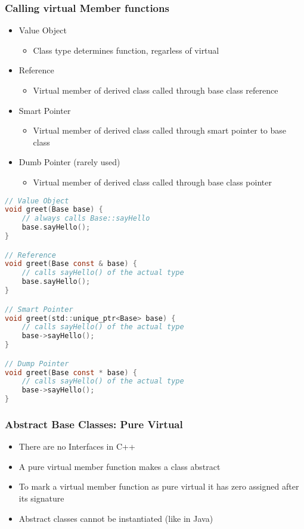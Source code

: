 \subsubsection{Calling virtual Member functions}
\begin{itemize}
    \item Value Object
    \begin{itemize}
        \item Class type determines function, regarless of virtual
    \end{itemize}
    \item Reference
    \begin{itemize}
        \item Virtual member of derived class called through base class reference
    \end{itemize}
    \item Smart Pointer
    \begin{itemize}
        \item Virtual member of derived class called through smart pointer to base class
    \end{itemize}
    \item Dumb Pointer (rarely used)
    \begin{itemize}
        \item Virtual member of derived class called through base class pointer
    \end{itemize}
\end{itemize}

\begin{lstlisting}[style=frame, style= linenumbers, language=C]
// Value Object
void greet(Base base) {
    // always calls Base::sayHello
    base.sayHello();
}

// Reference
void greet(Base const & base) {
    // calls sayHello() of the actual type
    base.sayHello();
}

// Smart Pointer
void greet(std::unique_ptr<Base> base) {
    // calls sayHello() of the actual type
    base->sayHello();
}

// Dump Pointer
void greet(Base const * base) {
    // calls sayHello() of the actual type
    base->sayHello();
}
\end{lstlisting}

\subsubsection{Abstract Base Classes: Pure Virtual}
\begin{itemize}
    \item There are no Interfaces in C++
    \item A pure virtual member function makes a class abstract
    \item To mark a virtual member function as pure virtual it has zero assigned after its signature
    \item Abstract classes cannot be instantiated (like in Java)
\end{itemize}

